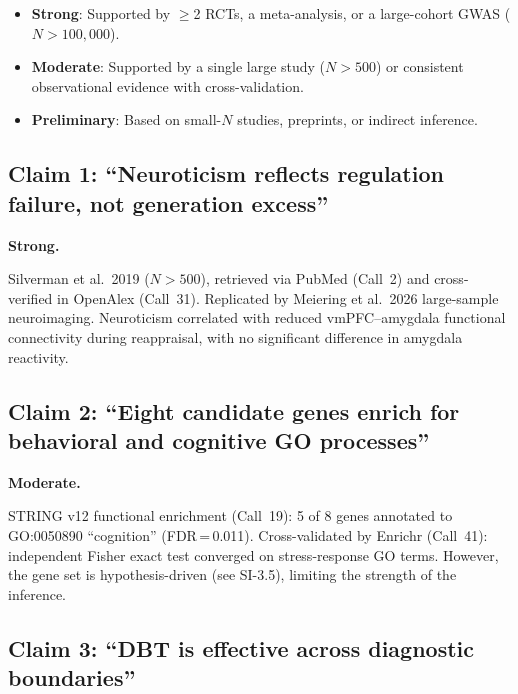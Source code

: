 \begin{itemize}[nosep]
  \item \textbf{Strong}: Supported by $\geq$2 RCTs, a meta-analysis, or a
        large-cohort GWAS ($N > 100{,}000$).
  \item \textbf{Moderate}: Supported by a single large study ($N > 500$)
        or consistent observational evidence with cross-validation.
  \item \textbf{Preliminary}: Based on small-$N$ studies, preprints, or
        indirect inference.
\end{itemize}

\subsection*{Claim 1: ``Neuroticism reflects regulation failure, not
generation excess''}

\begin{description}[style=nextline, nosep]
  \item[Grade] \textbf{Strong.}
  \item[Evidence chain]
    Silverman et al.\ 2019 ($N > 500$), retrieved via PubMed (Call~2) and
    cross-verified in OpenAlex (Call~31).  Replicated by Meiering et al.\
    2026 large-sample neuroimaging.  Neuroticism correlated with reduced
    vmPFC--amygdala functional connectivity during reappraisal, with no
    significant difference in amygdala reactivity.
\end{description}

\subsection*{Claim 2: ``Eight candidate genes enrich for behavioral and
cognitive GO processes''}

\begin{description}[style=nextline, nosep]
  \item[Grade] \textbf{Moderate.}
  \item[Evidence chain]
    STRING v12 functional enrichment (Call~19): 5 of 8 genes annotated to
    GO:0050890 ``cognition'' (FDR\,=\,0.011).  Cross-validated by Enrichr
    (Call~41): independent Fisher exact test converged on stress-response
    GO terms.  However, the gene set is hypothesis-driven (see SI-3.5),
    limiting the strength of the inference.
\end{description}

\subsection*{Claim 3: ``DBT is effective across diagnostic boundaries''}

